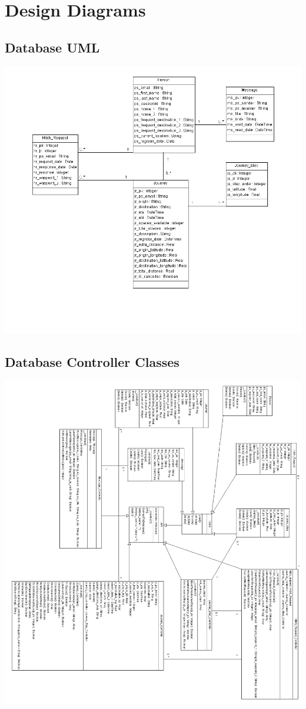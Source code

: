 \chapter{Design Diagrams}
\section{Database UML}
\includegraphics[width=\textwidth]{Appendix4/database.png}

\section{Database Controller Classes}
\includegraphics[width=\textwidth]{Appendix4/database_controller_api_2.png}